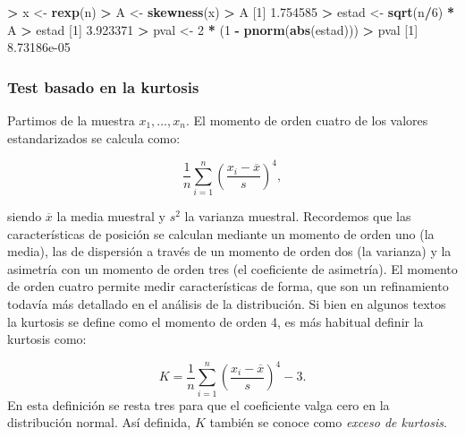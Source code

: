 \documentclass[
  a4paper,
  oneside]{scrbook}
\newenvironment{Shaded}{\begin{snugshade}}{\end{snugshade}}
\newcommand{\DecValTok}[1]{\textcolor[rgb]{0.00,0.00,0.81}{#1}}
\newcommand{\FloatTok}[1]{\textcolor[rgb]{0.00,0.00,0.81}{#1}}
\newcommand{\FunctionTok}[1]{\textcolor[rgb]{0.13,0.29,0.53}{\textbf{#1}}}
\newcommand{\NormalTok}[1]{#1}
\newcommand{\OtherTok}[1]{\textcolor[rgb]{0.56,0.35,0.01}{#1}}
\newcommand{\SpecialCharTok}[1]{\textcolor[rgb]{0.81,0.36,0.00}{\textbf{#1}}}
\theoremstyle{definition}
\theoremstyle{definition}
\theoremstyle{definition}
\theoremstyle{definition}
\theoremstyle{remark}
\begin{document}
\begin{Shaded}
\begin{Highlighting}[]
\SpecialCharTok{\textgreater{}}\NormalTok{ x }\OtherTok{\textless{}{-}} \FunctionTok{rexp}\NormalTok{(n)}
\SpecialCharTok{\textgreater{}}\NormalTok{ A }\OtherTok{\textless{}{-}} \FunctionTok{skewness}\NormalTok{(x)}
\SpecialCharTok{\textgreater{}}\NormalTok{ A}
\NormalTok{[}\DecValTok{1}\NormalTok{] }\FloatTok{1.754585}
\SpecialCharTok{\textgreater{}}\NormalTok{ estad }\OtherTok{\textless{}{-}} \FunctionTok{sqrt}\NormalTok{(n}\SpecialCharTok{/}\DecValTok{6}\NormalTok{) }\SpecialCharTok{*}\NormalTok{ A}
\SpecialCharTok{\textgreater{}}\NormalTok{ estad}
\NormalTok{[}\DecValTok{1}\NormalTok{] }\FloatTok{3.923371}
\SpecialCharTok{\textgreater{}}\NormalTok{ pval }\OtherTok{\textless{}{-}} \DecValTok{2} \SpecialCharTok{*}\NormalTok{ (}\DecValTok{1} \SpecialCharTok{{-}} \FunctionTok{pnorm}\NormalTok{(}\FunctionTok{abs}\NormalTok{(estad)))}
\SpecialCharTok{\textgreater{}}\NormalTok{ pval}
\NormalTok{[}\DecValTok{1}\NormalTok{] }\FloatTok{8.73186e{-}05}
\end{Highlighting}
\end{Shaded}

\normalsize

\subsubsection{Test basado en la kurtosis}\label{test-basado-en-la-kurtosis}

Partimos de la muestra \(x_1,\ldots,x_n\). El momento de orden cuatro de
los valores estandarizados se calcula como:

\[\frac{1}{n}\sum_{i=1}^n\left(\frac{x_i-\overline{x}}{s}\right)^4,\]

siendo \(\overline{x}\) la media muestral y \(s^2\) la varianza muestral.
Recordemos que las características de posición se calculan mediante un
momento de orden uno (la media), las de dispersión a través de un
momento de orden dos (la varianza) y la asimetría con un momento de
orden tres (el coeficiente de asimetría). El momento de orden cuatro
permite medir características de forma, que son un refinamiento todavía
más detallado en el análisis de la distribución. Si bien en algunos
textos la kurtosis se define como el momento de orden 4, es más habitual
definir la kurtosis como:

\[K=\frac{1}{n}\sum_{i=1}^n\left(\frac{x_i-\overline{x}}{s}\right)^4-3.\]
En esta definición se resta tres para que el coeficiente valga cero en
la distribución normal. Así definida, \(K\) también se conoce como \emph{exceso
de kurtosis}.
\end{document}

